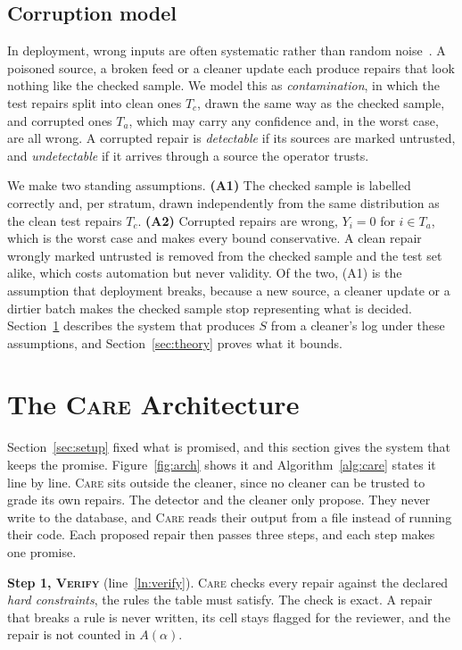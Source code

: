 \documentclass[sigconf, nonacm, balance=false]{acmart}
\theoremstyle{remark}
\begin{document}
\subsection{Corruption model}
In deployment, wrong inputs are often systematic rather than random
noise~\cite{10.1145/3774914}. A poisoned source, a broken feed or a cleaner update
each produce repairs that look nothing like the checked sample. We model this as
\emph{contamination}, in which the test repairs split into clean ones $T_c$, drawn the
same way as the checked sample, and corrupted ones $T_a$, which may carry any
confidence and, in the worst case, are all wrong. A corrupted repair is
\emph{detectable} if its sources are marked untrusted, and \emph{undetectable} if it
arrives through a source the operator trusts.

We make two standing assumptions. \textbf{(A1)} The checked sample is labelled
correctly and, per stratum, drawn independently from the same distribution as the
clean test repairs $T_c$. \textbf{(A2)} Corrupted repairs are wrong, $Y_i=0$ for
$i\in T_a$, which is the worst case and makes every bound conservative. A clean repair
wrongly marked untrusted is removed from the checked sample and the test set alike,
which costs automation but never validity. Of the two, (A1) is the assumption that
deployment breaks, because a new source, a cleaner update or a dirtier batch makes the
checked sample stop representing what is decided. Section~\ref{sec:arch} describes
the system that produces $S$ from a cleaner's log under these assumptions, and
Section~\ref{sec:theory} proves what it bounds.

\section{The \textsc{Care} Architecture}
\label{sec:arch}

Section~\ref{sec:setup} fixed what is promised, and this section gives the system
that keeps the promise. Figure~\ref{fig:arch} shows it and Algorithm~\ref{alg:care}
states it line by line. \textsc{Care} sits outside the cleaner, since no cleaner can be
trusted to grade its own repairs. The detector and the cleaner only propose. They never
write to the database, and \textsc{Care} reads their output from a file instead of
running their code. Each proposed repair then passes three steps, and each step makes
one promise.

\textbf{Step 1, \textsc{Verify}} (line~\ref{ln:verify}). \textsc{Care} checks every
repair against the declared \emph{hard constraints}, the rules the table must satisfy.
The check is exact. A repair that breaks a rule is never written, its cell stays
flagged for the reviewer, and the repair is not counted in $A(\alpha)$.
\end{document}
